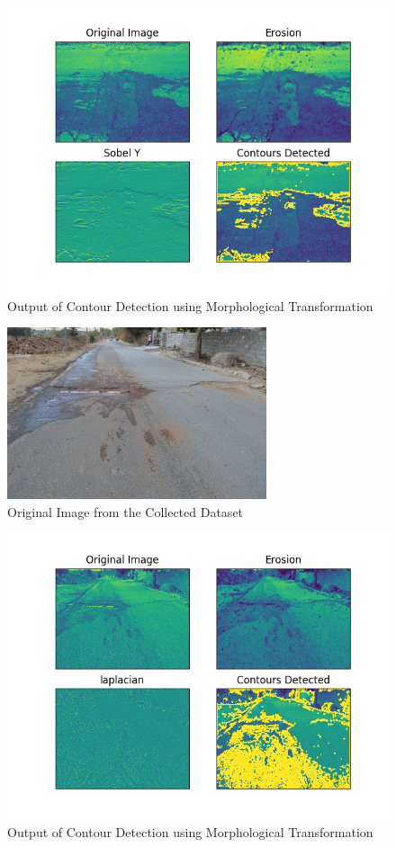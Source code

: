 \documentclass[12pt,a4paper]{article}
\begin{document}
\begin{itemize}
    \begin{figure}[ht!]
        \centering
        \includegraphics[width = 5in]{images/morph_transform_5.png}
        \caption{Output of Contour Detection using Morphological Transformation}
    \end{figure}
    \pagebreak
    
    \begin{figure}[ht!]
        \centering
        \includegraphics[width = 3in]{images/road_cam_4.jpg}
        \caption{Original Image from the Collected Dataset}
    \end{figure}

    \begin{figure}[ht!]
        \centering
        \includegraphics[width = 5in]{images/morph_transform_1.png}
        \caption{Output of Contour Detection using Morphological Transformation}
    \end{figure}
    \pagebreak
    

\end{itemize}
\end{document}
